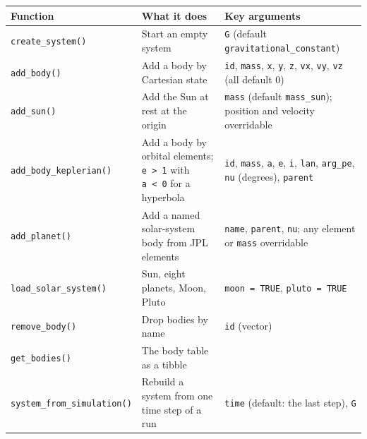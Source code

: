 \documentclass[
  10.5pt,
  letterpaper,
]{scrbook}
\newcounter{none} %
\theoremstyle{definition}
\theoremstyle{plain}
\theoremstyle{remark}
\begin{document}
{\def\LTcaptype{none} %
\begin{longtable}[]{@{}
  >{\raggedright\arraybackslash}p{}
  >{\raggedright\arraybackslash}p{}
  >{\raggedright\arraybackslash}p{}@{}}
\toprule\noalign{}
\begin{minipage}[b]{\linewidth}\raggedright
Function
\end{minipage} & \begin{minipage}[b]{\linewidth}\raggedright
What it does
\end{minipage} & \begin{minipage}[b]{\linewidth}\raggedright
Key arguments
\end{minipage} \\
\midrule\noalign{}
\endhead
\bottomrule\noalign{}
\endlastfoot
\texttt{create\_system()} & Start an empty system & \texttt{G} (default
\texttt{gravitational\_constant}) \\
\texttt{add\_body()} & Add a body by Cartesian state & \texttt{id},
\texttt{mass}, \texttt{x}, \texttt{y}, \texttt{z}, \texttt{vx},
\texttt{vy}, \texttt{vz} (all default 0) \\
\texttt{add\_sun()} & Add the Sun at rest at the origin & \texttt{mass}
(default \texttt{mass\_sun}); position and velocity overridable \\
\texttt{add\_body\_keplerian()} & Add a body by orbital elements;
\texttt{e\ \textgreater{}\ 1} with \texttt{a\ \textless{}\ 0} for a
hyperbola & \texttt{id}, \texttt{mass}, \texttt{a}, \texttt{e},
\texttt{i}, \texttt{lan}, \texttt{arg\_pe}, \texttt{nu} (degrees),
\texttt{parent} \\
\texttt{add\_planet()} & Add a named solar-system body from JPL elements
& \texttt{name}, \texttt{parent}, \texttt{nu}; any element or
\texttt{mass} overridable \\
\texttt{load\_solar\_system()} & Sun, eight planets, Moon, Pluto &
\texttt{moon\ =\ TRUE}, \texttt{pluto\ =\ TRUE} \\
\texttt{remove\_body()} & Drop bodies by name & \texttt{id} (vector) \\
\texttt{get\_bodies()} & The body table as a tibble & \\
\texttt{system\_from\_simulation()} & Rebuild a system from one time
step of a run & \texttt{time} (default: the last step), \texttt{G} \\
\end{longtable}
}
\end{document}

